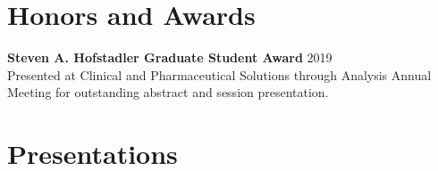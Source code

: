 \documentclass[10pt, letterpaper]{article}
\begin{document}
\section{Honors and Awards}

\textbf{Steven A. Hofstadler Graduate Student Award} \hfill 2019 \\
Presented at Clinical and Pharmaceutical Solutions through Analysis Annual Meeting for outstanding
abstract and session presentation.

\section{Presentations}
\end{document}
